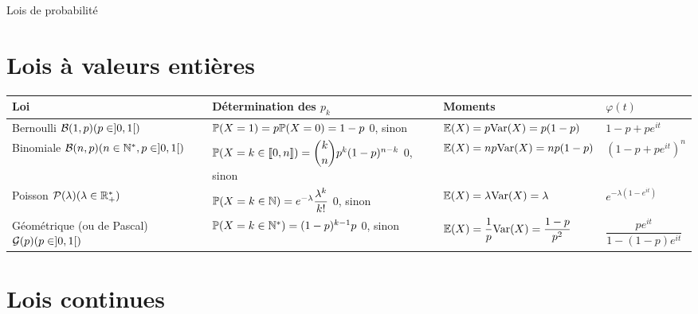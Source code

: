 \documentclass[a4paper, 11pt]{article}
\begin{document}
\begin{center}
{\Huge Lois de probabilité} 
\end{center}

\section{Lois à valeurs entières}

\begin{tabular}{|M{3.7cm}|M{6.8cm}|M{3.2cm}|M{3.5cm}|}
\hline
Loi & Détermination des $p_k$ & Moments & $\varphi(t)$ \\
\hline 
\hline 
Bernoulli $\mathcal{B}(1,p) \newline (p \in ]0,1[)$ & $\mathbb{P}(X=1)=p \newline \mathbb{P}(X=0)=1-p \newline$ 0, sinon & $\mathbb{E}(X)=p \newline \text{Var}(X)=p(1-p)$ & $1-p+pe^{it}$ \\
\hline
Binomiale $\mathcal{B}(n,p) \newline (n \in \mathbb{N}^*, p\in ]0,1[)$ & $\mathbb{P}(X = k \in [\![0,n]\!]) = \dbinom{k}{n}p^k(1-p)^{n-k} \newline$ 0, sinon & $\mathbb{E}(X)=np \newline \text{Var}(X)=np(1-p)$ & $(1-p+pe^{it})^n$ \\
\hline
Poisson $\mathcal{P}(\lambda)  \newline (\lambda \in \mathbb{R}_+^*)$ & $\mathbb{P}(X = k \in \mathbb{N}) = e^{-\lambda} \dfrac{\lambda^k}{k!} \newline$ 0, sinon & $\mathbb{E}(X)=\lambda \newline \text{Var}(X)=\lambda$ & $e^{-\lambda(1-e^{it})}$ \\
\hline
Géométrique (ou de Pascal) $\mathcal{G}(p) \newline (p \in ]0,1[)$ & $\mathbb{P}(X = k \in \mathbb{N}^*) = (1-p)^{k-1}p \newline$ 0, sinon & $\mathbb{E}(X)=\dfrac{1}{p} \newline \text{Var}(X)=\dfrac{1-p}{p^2}$ & $\dfrac{pe^{it}}{1-(1-p)e^{it}}$ \\
\hline
\end{tabular}

\section{Lois continues}
\end{document}
